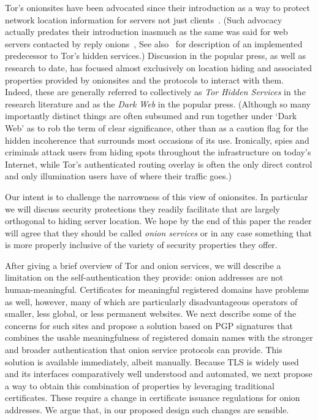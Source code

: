 \documentclass[10pt, conference, compsocconf]{styles/IEEEtran}
\begin{document}
Tor's onionsites have been advocated since their introduction as a way
to protect network location information for servers not just
clients~\cite{tor-design}. (Such advocacy actually predates their
introduction inasmuch as the same was said for web servers contacted
by reply onions~\cite{onion-routing:cacm99}, See also~\cite{rewebber}
for description of an implemented predecessor to Tor's hidden
services.)  Discussion in the popular press, as well as research to
date, has focused almost exclusively on location hiding and associated
properties provided by onionsites and the protocols to interact with
them. Indeed, these are generally referred to collectively as
\emph{Tor Hidden Services} in the research literature and as the
\emph{Dark Web} in the popular press. (Although so many importantly
distinct things are often subsumed and run together under `Dark Web'
as to rob the term of clear significance, other than as a caution flag
for the hidden incoherence that surrounds most occasions of its
use. Ironically, spies and criminals attack users from hiding spots
throughout the infrastructure on today's Internet, while Tor's
authenticated routing overlay is often the only direct control and
only illumination users have of where their traffic goes.)

Our intent is to challenge the narrowness of this view of
onionsites. In particular we will discuss security protections they
readily facilitate that are largely orthogonal to hiding server
location. We hope by the end of this paper the reader will agree that
they should be called \emph{onion services} or in any
case something that is more properly inclusive of the variety of
security properties they offer.


After giving a brief overview of Tor and onion services, we will
describe a limitation on the self-authentication they provide: onion
addresses are not human-meaningful. Certificates for meaningful
registered domains have problems as well, however, many of which are
particularly disadvantageous operators of smaller, less global, or
less permanent websites.  We next describe some of the concerns for
such sites and propose a solution based on PGP signatures that
combines the usable meaningfulness of registered domain names with the
stronger and broader authentication that onion service protocols can
provide.  This solution is available immediately, albeit manually.
Because TLS is widely used and its interfaces comparatively well
understood and automated, we next propose a way to obtain this
combination of properties by leveraging traditional certificates.
These require a change in certificate issuance regulations for onion
addresses.  We argue that, in our proposed design such changes are
sensible.
\end{document}
